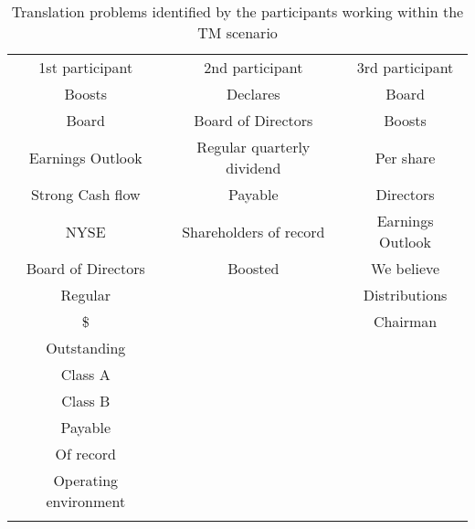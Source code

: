\documentclass[output=paper]{LSP/langsci}
\begin{document}
\begin{table}[t]
\small
 \caption{Translation problems identified by the participants working within the TM scenario}
 \label{rossetti-gaspari:tab:1}
\begin{tabularx}{\textwidth}{ccc}
\lsptoprule
\multicolumn{3}{c}{Translation problems in the TM scenario}\\
\midrule
 1st participant & 2nd participant & 3rd participant\\
\midrule
  Boosts &  Declares &  Board\\
  Board &  Board of Directors &  Boosts\\
  Earnings Outlook &  Regular quarterly dividend &  Per share\\
  Strong Cash flow &  Payable &  Directors\\
  NYSE &  Shareholders of record &  Earnings Outlook\\
  Board of Directors &  Boosted &  We believe\\
  Regular &  &  Distributions\\
  \$ &  &  Chairman\\
  Outstanding &  & \\
  Class A &  & \\
  Class B &  & \\
  Payable &  & \\
  Of record &  & \\
  Operating environment &  & \\
\lspbottomrule
\end{tabularx}
\end{table}
\end{document}
